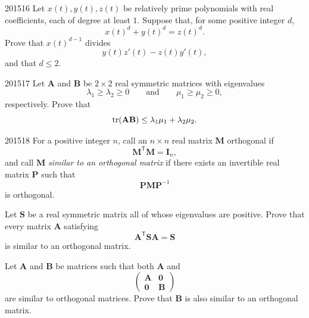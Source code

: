 \begin{problem}{2015}{1}{6}
Let $x(t), y(t), z(t)$ be relatively prime polynomials with real coefficients, each of degree at least $1$. Suppose that, for some positive integer $d$,
\[
    x(t)^d+y(t)^d=z(t)^d.
\]
Prove that $x(t)^{d-1}$ divides
\[
    y(t)z'(t)-z(t)y'(t),
\]
and that $d\le2$.
\end{problem}

\begin{problem}{2015}{1}{7}
Let $\mathbf A$ and $\mathbf B$ be $2\times2$ real symmetric matrices with eigenvalues
\[
    \lambda_1\ge\lambda_2\ge0
    \qquad\text{and}\qquad
    \mu_1\ge\mu_2\ge0,
\]
respectively. Prove that
\[
    \operatorname{tr}(\mathbf A\mathbf B)
    \le
    \lambda_1\mu_1+\lambda_2\mu_2.
\]
\end{problem}

\begin{problem}{2015}{1}{8}
For a positive integer $n$, call an $n\times n$ real matrix $\mathbf M$ orthogonal if
\[
    \mathbf M^{\mathsf T}\mathbf M=\mathbf I_n,
\]
and call $\mathbf M$ \emph{similar to an orthogonal matrix} if there exists an invertible real matrix $\mathbf P$ such that
\[
    \mathbf P\mathbf M\mathbf P^{-1}
\]
is orthogonal.
\begin{problemsubparts}
    \item Let $\mathbf S$ be a real symmetric matrix all of whose eigenvalues are positive. Prove that every matrix $\mathbf A$ satisfying
    \[
        \mathbf A^{\mathsf T}\mathbf S\mathbf A=\mathbf S
    \]
    is similar to an orthogonal matrix.
    \item Let $\mathbf A$ and $\mathbf B$ be matrices such that both $\mathbf A$ and
    \[
        \begin{pmatrix}
            \mathbf A&\mathbf0\\
            \mathbf0&\mathbf B
        \end{pmatrix}
    \]
    are similar to orthogonal matrices. Prove that $\mathbf B$ is also similar to an orthogonal matrix.
\end{problemsubparts}
\end{problem}

